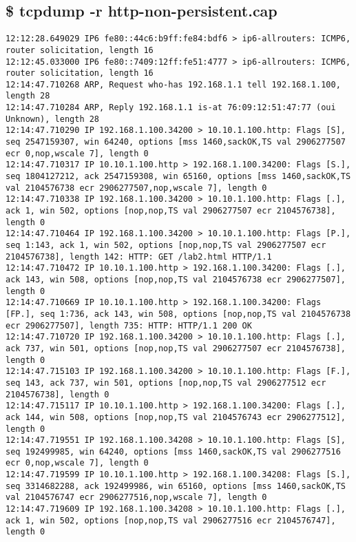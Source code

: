 \documentclass{article}
\begin{document}
\subsection{\$ tcpdump -r http-non-persistent.cap}
{\scriptsize
\begin{lstlisting}
12:12:28.649029 IP6 fe80::44c6:b9ff:fe84:bdf6 > ip6-allrouters: ICMP6, router solicitation, length 16
12:12:45.033000 IP6 fe80::7409:12ff:fe51:4777 > ip6-allrouters: ICMP6, router solicitation, length 16
12:14:47.710268 ARP, Request who-has 192.168.1.1 tell 192.168.1.100, length 28
12:14:47.710284 ARP, Reply 192.168.1.1 is-at 76:09:12:51:47:77 (oui Unknown), length 28
12:14:47.710290 IP 192.168.1.100.34200 > 10.10.1.100.http: Flags [S], seq 2547159307, win 64240, options [mss 1460,sackOK,TS val 2906277507 ecr 0,nop,wscale 7], length 0
12:14:47.710317 IP 10.10.1.100.http > 192.168.1.100.34200: Flags [S.], seq 1804127212, ack 2547159308, win 65160, options [mss 1460,sackOK,TS val 2104576738 ecr 2906277507,nop,wscale 7], length 0
12:14:47.710338 IP 192.168.1.100.34200 > 10.10.1.100.http: Flags [.], ack 1, win 502, options [nop,nop,TS val 2906277507 ecr 2104576738], length 0
12:14:47.710464 IP 192.168.1.100.34200 > 10.10.1.100.http: Flags [P.], seq 1:143, ack 1, win 502, options [nop,nop,TS val 2906277507 ecr 2104576738], length 142: HTTP: GET /lab2.html HTTP/1.1
12:14:47.710472 IP 10.10.1.100.http > 192.168.1.100.34200: Flags [.], ack 143, win 508, options [nop,nop,TS val 2104576738 ecr 2906277507], length 0
12:14:47.710669 IP 10.10.1.100.http > 192.168.1.100.34200: Flags [FP.], seq 1:736, ack 143, win 508, options [nop,nop,TS val 2104576738 ecr 2906277507], length 735: HTTP: HTTP/1.1 200 OK
12:14:47.710720 IP 192.168.1.100.34200 > 10.10.1.100.http: Flags [.], ack 737, win 501, options [nop,nop,TS val 2906277507 ecr 2104576738], length 0
12:14:47.715103 IP 192.168.1.100.34200 > 10.10.1.100.http: Flags [F.], seq 143, ack 737, win 501, options [nop,nop,TS val 2906277512 ecr 2104576738], length 0
12:14:47.715117 IP 10.10.1.100.http > 192.168.1.100.34200: Flags [.], ack 144, win 508, options [nop,nop,TS val 2104576743 ecr 2906277512], length 0
12:14:47.719551 IP 192.168.1.100.34208 > 10.10.1.100.http: Flags [S], seq 192499985, win 64240, options [mss 1460,sackOK,TS val 2906277516 ecr 0,nop,wscale 7], length 0
12:14:47.719599 IP 10.10.1.100.http > 192.168.1.100.34208: Flags [S.], seq 3314682288, ack 192499986, win 65160, options [mss 1460,sackOK,TS val 2104576747 ecr 2906277516,nop,wscale 7], length 0
12:14:47.719609 IP 192.168.1.100.34208 > 10.10.1.100.http: Flags [.], ack 1, win 502, options [nop,nop,TS val 2906277516 ecr 2104576747], length 0

\end{lstlisting}}
\end{document}
